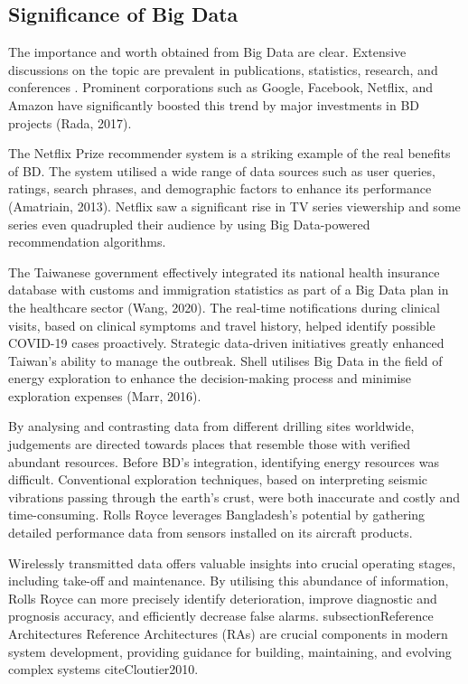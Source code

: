 \documentclass[preprint,12pt]{elsarticle}
\begin{document}
\subsection{Significance of Big Data}\label{sec:The Value of Big Data} 

The importance and worth obtained from Big Data are clear. Extensive discussions on the topic are prevalent in publications, statistics, research, and conferences \cite{Chen2012}. Prominent corporations such as Google, Facebook, Netflix, and Amazon have significantly boosted this trend by major investments in BD projects (Rada, 2017). 

The Netflix Prize recommender system is a striking example of the real benefits of BD. The system utilised a wide range of data sources such as user queries, ratings, search phrases, and demographic factors to enhance its performance (Amatriain, 2013). Netflix saw a significant rise in TV series viewership and some series even quadrupled their audience by using Big Data-powered recommendation algorithms. 

The Taiwanese government effectively integrated its national health insurance database with customs and immigration statistics as part of a Big Data plan in the healthcare sector (Wang, 2020). The real-time notifications during clinical visits, based on clinical symptoms and travel history, helped identify possible COVID-19 cases proactively. Strategic data-driven initiatives greatly enhanced Taiwan's ability to manage the outbreak. Shell utilises Big Data in the field of energy exploration to enhance the decision-making process and minimise exploration expenses (Marr, 2016). 

By analysing and contrasting data from different drilling sites worldwide, judgements are directed towards places that resemble those with verified abundant resources. Before BD's integration, identifying energy resources was difficult. Conventional exploration techniques, based on interpreting seismic vibrations passing through the earth's crust, were both inaccurate and costly and time-consuming. Rolls Royce leverages Bangladesh's potential by gathering detailed performance data from sensors installed on its aircraft products. 

Wirelessly transmitted data offers valuable insights into crucial operating stages, including take-off and maintenance. By utilising this abundance of information, Rolls Royce can more precisely identify deterioration, improve diagnostic and prognosis accuracy, and efficiently decrease false alarms. subsectionReference Architectures Reference Architectures (RAs) are crucial components in modern system development, providing guidance for building, maintaining, and evolving complex systems citeCloutier2010. 
\end{document}
